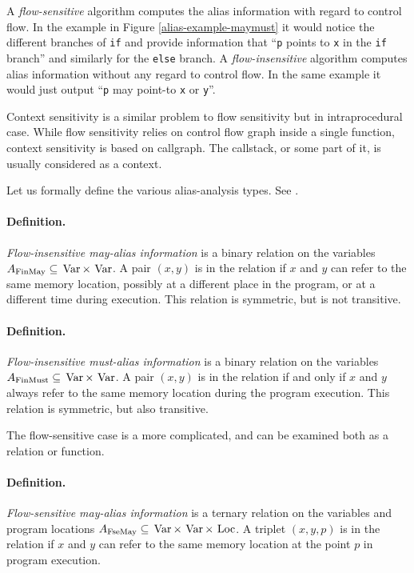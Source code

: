 A {\it flow-sensitive} algorithm computes the alias information with regard to control
flow. In the example in Figure \ref{alias-example-maymust} it would notice the
different branches of {\tt if} and provide information that ``{\tt p} points to
{\tt x} in the {\tt if} branch'' and similarly for the {\tt else} branch.
A {\it flow-insensitive} algorithm computes alias information without any regard
to control flow. In the same example it would just output ``{\tt p} may point-to
{\tt x} or {\tt y}''.

Context sensitivity is a similar problem to flow sensitivity but in
intraprocedural case. While flow sensitivity relies on control flow graph inside
a single function, context sensitivity is based on callgraph. The callstack, or
some part of it, is usually considered as a context.

Let us formally define the various alias-analysis
types. See \cite{muchnick1997advanced}.

\paragraph{Definition.} {\it Flow-insensitive may-alias information} is a binary
relation on the variables $A_{\mathrm{FinMay}} \subseteq \operatorname*{\,Var} \times \operatorname*{\,Var} $. A pair
$(x,y)$ is in the relation if $x$ and $y$ can refer to the same
memory location, possibly at a different place in the program, or at a different
time during execution. This relation is symmetric, but is not transitive.

\paragraph{Definition.} {\it Flow-insensitive must-alias information} is a binary
relation on the variables $A_{\mathrm{FinMust}} \subseteq \operatorname*{\,Var} \times \operatorname*{\,Var}$. A pair
$(x,y)$ is in the relation if and only if $x$ and $y$ always refer to the same
memory location during the program execution. This relation is symmetric, but
also transitive. 

The flow-sensitive case is a more complicated, and can be examined both as a
relation or function.

\paragraph{Definition.} {\it Flow-sensitive may-alias information} is a ternary
relation on the variables and program locations $A_{\mathrm{FseMay}} \subseteq
\operatorname*{\,Var} \times \operatorname*{\,Var} \times \operatorname*{\,Loc}$. A triplet $(x,y,p)$ is in the relation if $x$
and $y$ can refer to the same memory location at the point $p$ in program
execution.

